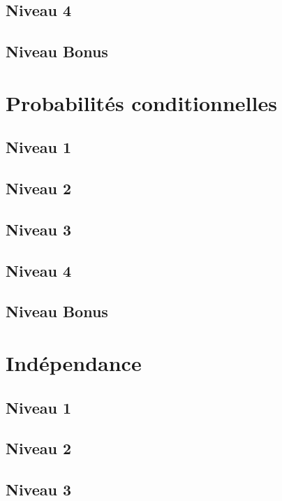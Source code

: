 \documentclass[a4paper]{report}
\begin{document}
			\subsection{Niveau 4}
			
			\subsection{Niveau Bonus}
		
		\section{Probabilités conditionnelles}
		
			\subsection{Niveau 1}
		
			\subsection{Niveau 2}
		
			\subsection{Niveau 3}
			
			\subsection{Niveau 4}
			
			\subsection{Niveau Bonus}
		
		\section{Indépendance}
		
			\subsection{Niveau 1}
		
			\subsection{Niveau 2}
		
			\subsection{Niveau 3}
			
\end{document}
